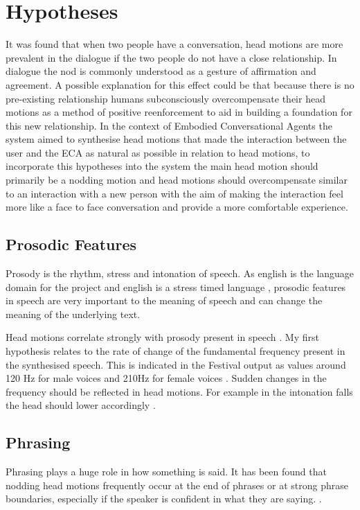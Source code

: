 \documentclass[bsc,frontabs,twoside,singlespacing,parskip]{infthesis}
\begin{document}
\section{Hypotheses}

It was  found that when two people have a conversation, head motions are more prevalent in the dialogue if the two people do not have a close relationship. \cite{first_paper} In dialogue the nod is commonly understood as a gesture of affirmation and agreement. A possible explanation for this effect could be that because there is no pre-existing relationship humans subconsciously overcompensate their head motions as a method of positive reenforcement to aid in building a foundation for this new relationship. In the context of Embodied Conversational Agents the system aimed to synthesise head motions that made the interaction between the user and the ECA as natural as possible in relation to head motions, to incorporate this hypotheses into the system the main head motion should primarily be a nodding motion and head motions should overcompensate similar to an interaction with a new person with the aim of making the interaction feel more like a face to face conversation and provide a  more comfortable experience.

\subsection{Prosodic Features}

Prosody is the rhythm, stress and intonation of speech. As english is the language domain for the project and english is a stress timed language \cite{stress_timed}, prosodic features in speech are very important to the meaning of speech and can change the meaning of the underlying text.

Head motions correlate strongly with prosody present in speech \cite{vis_prosody}. My first hypothesis relates to the rate of change of the fundamental frequency present in the synthesised speech. This is indicated in the Festival output as values around 120 Hz for male voices and 210Hz for female voices \cite{f0_values}. Sudden changes in the frequency should be reflected in head motions. For example in the intonation falls the head should lower accordingly \cite{Kendon}.

\subsection{Phrasing}

Phrasing plays a huge role in how something is said. It has been found that nodding head motions frequently occur at the end of phrases or at strong phrase boundaries, especially if the speaker is confident in what they are saying. \cite{ishi2008}. 
\end{document}
